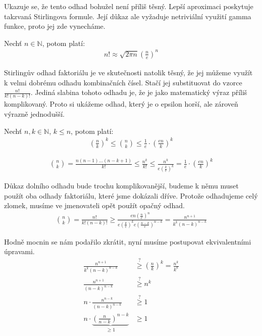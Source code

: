 Ukazuje se, že tento odhad bohužel není příliš těsný. Lepší aproximaci poskytuje takzvaná Stirlingova formule. Její důkaz ale vyžaduje netriviální využití gamma funkce, proto jej zde vynecháme.
\begin{t_fact}
  Nechť $n\in\mathbb{N}$, potom platí:
  \begin{align*}
    n! \approx \sqrt{2\pi n}\left(\frac{n}{e}\right)^n
  \end{align*}  
\end{t_fact}

Stirlingův odhad faktoriálu je ve skutečnosti natolik těsný, že jej můžeme využít k velmi dobrému odhadu kombinačních čísel. Stačí jej substituovat do vzorce $\frac{n!}{k!(n-k)!}$. Jediná slabina tohoto odhadu je, že je jako matematický výraz příliš komplikovaný. Proto si ukážeme odhad, který je o epsilon horší, ale zároveň výrazně jednodušší.

\begin{t_theorem}
  Nechť $n,k\in\mathbb{N}$, $k\leq n$, potom platí:
  \begin{align*}
    \left(\frac{n}{k}\right)^k\leq \binom{n}{k}\leq \frac{1}{e}\cdot\left(\frac{en}{k}\right)^k
  \end{align*}
\end{t_theorem}
\begin{t_proof}
  \begin{align*}
    \binom{n}{k}=\frac{n(n-1)\dots(n-k+1)}{k!}
    \leq \frac{n^k}{k!}
    \leq \frac{n^k}{e\left(\frac{k}{e}\right)^k}
    = \frac{1}{e}\cdot\left(\frac{en}{k}\right)^k
  \end{align*}
  
  Důkaz dolního odhadu bude trochu komplikovanější, budeme k němu muset použít oba odhady faktoriálu, které jsme dokázali dříve. Protože odhadujeme celý zlomek, musíme ve jmenovateli opět použít opačný odhad.
  \begin{align*}
    \binom{n}{k}
    = \frac{n!}{k!(n-k)!}
    \geq \frac{en\left(\frac{n}{e}\right)^n}{e\left(\frac{k}{e}\right)^ke\left(\frac{n-k}{e}\right)^{n-k}}
    = \frac{n^{n+1}}{k^k(n-k)^{n-k}}
  \end{align*}
  
  Hodně mocnin se nám podařilo zkrátit, nyní musíme postupovat ekvivalentními úpravami.
  \begin{align*}
    \frac{n^{n+1}}{k^k(n-k)^{n-k}}
    &\stackrel{?}{\geq} \left(\frac{n}{k}\right)^k=\frac{n^k}{k^k}\\
    \frac{n^{n+1}}{(n-k)^{n-k}}
    &\stackrel{?}{\geq} n^k\\
    n\cdot \frac{n^{n-k}}{(n-k)^{n-k}}
    &\stackrel{?}{\geq} 1\\
    n\cdot\underbrace{\left(\frac{n}{n-k}\right)^{n-k}}_{\geq 1}
    &\geq 1
  \end{align*}
\end{t_proof}

